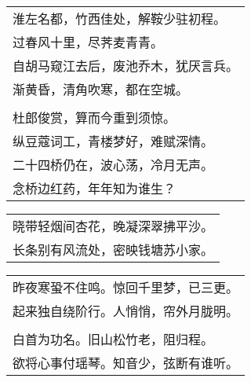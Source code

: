 \nopagebreak%
\nopagebreak%
\noindent\begin{minipage}{\linewidth}
  \vskip-3pt\begin{table}[H]
    \centering
    \begin{tabular}{@{}l@{}}
淮左名都，竹西佳处，解鞍少驻初程。\\
过春风十里，尽荠麦青青。\\
自胡马窥江去后，废池乔木，犹厌言兵。\\
渐黄昏，清角吹寒，都在空城。\\
\\
杜郎俊赏，算而今重到须惊。\\
纵豆蔻词工，青楼梦好，难赋深情。\\
二十四桥仍在，波心荡，冷月无声。\\
念桥边红药，年年知为谁生？
    \end{tabular}
  \end{table}
\end{minipage}
\vspace{1cm}


\nopagebreak%
\nopagebreak%
\noindent\begin{minipage}{\linewidth}
  \vskip-3pt\begin{table}[H]
    \centering
    \begin{tabular}{@{}l@{}}
晓带轻烟间杏花，晚凝深翠拂平沙。\\
长条别有风流处，密映钱塘苏小家。
    \end{tabular}
  \end{table}
\end{minipage}
\vspace{1cm}


\nopagebreak%
\nopagebreak%
\noindent\begin{minipage}{\linewidth}
  \vskip-3pt\begin{table}[H]
    \centering
    \begin{tabular}{@{}l@{}}
昨夜寒蛩不住鸣。惊回千里梦，已三更。\\
起来独自绕阶行。人悄悄，帘外月胧明。\\
\\
白首为功名。旧山松竹老，阻归程。\\
欲将心事付瑶琴。知音少，弦断有谁听。
    \end{tabular}
  \end{table}
\end{minipage}
\vspace{1cm}


